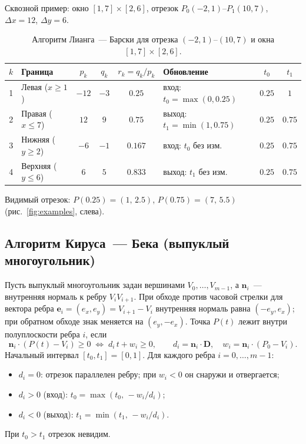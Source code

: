 \documentclass[11pt,a4paper]{article}
\begin{document}
Сквозной пример: окно $[1, 7] \times [2, 6]$, отрезок $P_0(-2, 1)$--$P_1(10, 7)$,
$\Delta x = 12$, $\Delta y = 6$.

\begin{table}[H]
\centering\small
\caption{Алгоритм Лианга~— Барски для отрезка $(-2,1)$--$(10,7)$ и окна $[1,7]\times[2,6]$.}
\begin{tabular}{clccclcc}
\toprule
$k$ & Граница & $p_k$ & $q_k$ & $r_k = q_k/p_k$ & Обновление & $t_0$ & $t_1$ \\
\midrule
1 & Левая ($x \ge 1$)   & $-12$ & $-3$ & $0.25$ & вход: $t_0 = \max(0, 0.25)$ & $0.25$ & $1$ \\
2 & Правая ($x \le 7$)  & $12$  & $9$  & $0.75$ & выход: $t_1 = \min(1, 0.75)$ & $0.25$ & $0.75$ \\
3 & Нижняя ($y \ge 2$)  & $-6$  & $-1$ & $0.167$ & вход: $t_0$ без изм. & $0.25$ & $0.75$ \\
4 & Верхняя ($y \le 6$) & $6$   & $5$  & $0.833$ & выход: $t_1$ без изм. & $0.25$ & $0.75$ \\
\bottomrule
\end{tabular}
\end{table}
Видимый отрезок: $P(0.25) = (1,\, 2.5)$, $P(0.75) = (7,\, 5.5)$ (рис.~\ref{fig:examples}, слева).

\subsection{Алгоритм Кируса~— Бека (выпуклый многоугольник)}
Пусть выпуклый многоугольник задан вершинами $V_0, \dots, V_{m-1}$, а $\mathbf{n}_i$~—
внутренняя нормаль к ребру $V_i V_{i+1}$. При обходе против часовой стрелки
для вектора ребра $\mathbf{e}_i = (e_x, e_y) = V_{i+1} - V_i$ внутренняя нормаль
равна $(-e_y, e_x)$; при обратном обходе знак меняется на $(e_y, -e_x)$.
Точка $P(t)$ лежит внутри полуплоскости ребра $i$, если
\[
  \mathbf{n}_i \cdot (P(t) - V_i) \ge 0
  \;\Longleftrightarrow\;
  d_i\, t + w_i \ge 0,
  \qquad d_i = \mathbf{n}_i \cdot \mathbf{D},\quad w_i = \mathbf{n}_i \cdot (P_0 - V_i).
\]
Начальный интервал $[t_0, t_1] = [0, 1]$. Для каждого ребра $i = 0, \dots, m - 1$:
\begin{itemize}[label=--, leftmargin=1.5em, itemsep=0.1em, topsep=0.2em]
  \item $d_i = 0$: отрезок параллелен ребру; при $w_i < 0$ он снаружи и отвергается;
  \item $d_i > 0$ (вход): $t_0 = \max(t_0,\, -w_i / d_i)$;
  \item $d_i < 0$ (выход): $t_1 = \min(t_1,\, -w_i / d_i)$.
\end{itemize}
При $t_0 > t_1$ отрезок невидим.
\end{document}
